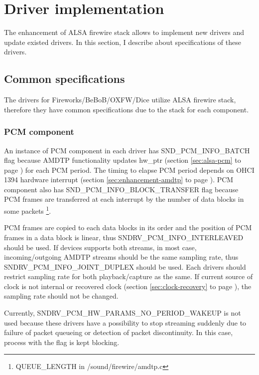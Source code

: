 \documentclass[onecolumn]{article}
\begin{document}
\section{Driver implementation}

The enhancement of ALSA firewire stack allows to implement new drivers and update existed drivers. In this section, I describe about specifications of these drivers.

\subsection{Common specifications}

The drivers for Fireworks/BeBoB/OXFW/Dice utilize ALSA firewire stack, therefore they have common specifications due to the stack for each component.

\subsubsection{PCM component}

An instance of PCM component in each driver has SND\_PCM\_INFO\_BATCH flag because AMDTP functionality updates hw\_ptr (section \ref{sec:alsa-pcm} to page \pageref{sec:alsa-pcm}) for each PCM period. The timing to elapse PCM period depends on OHCI 1394 hardware interrupt (section \ref{sec:enhancement-amdtp} to page \pageref{sec:enhancement-amdtp}). PCM component also has SND\_PCM\_INFO\_BLOCK\_TRANSFER flag because PCM frames are transferred at each interrupt by the number of data blocks in some packets \footnote{QUEUE\_LENGTH in /sound/firewire/amdtp.c}.

PCM frames are copied to each data blocks in its order and the position of PCM frames in a data block is linear, thus SNDRV\_PCM\_INFO\_INTERLEAVED should be used. If devices supports both streams, in most case, incoming/outgoing AMDTP streams should be the same sampling rate, thus SNDRV\_PCM\_INFO\_JOINT\_DUPLEX should be used. Each drivers should restrict sampling rate for both playback/capture as the same. If current source of clock is not internal or recovered clock (section \ref{sec:clock-recovery} to page \pageref{sec:clock-recovery}), the sampling rate should not be changed.

Currently, SNDRV\_PCM\_HW\_PARAMS\_NO\_PERIOD\_WAKEUP is not used because these drivers have a possibility to stop streaming suddenly due to failure of packet queueing or detection of packet discontinuity. In this case, process with the flag is kept blocking.
\end{document}
